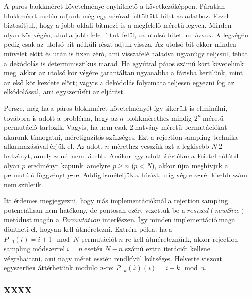 \documentclass[
    parspace,
    noindent,
    nohyp,
]{elteiktdk}[2023/04/10]
\begin{document}
A páros blokkméret követelménye enyhíthető a következőképpen.
Páratlan blokkméret esetén adjunk még egy zéróval feltöltött bitet az adathoz.
Ezzel biztosítjuk, hogy a jobb oldali bitmező is a megfelelő méretű legyen.
Minden olyan kör végén, ahol a jobb felet írtuk felül, az utolsó bitet nullázzuk.
A legvégén pedig csak az utolsó bit nélküli részt adjuk vissza.
Az utolsó bit ekkor minden művelet előtt és után is fixen zéró,
ami visszafelé haladva ugyanúgy teljesul, tehát a dekódolás is determinisztikus marad.
Ha egyúttal páros számú kört követelünk meg,
akkor az utolsó kör végére garantáltan ugyanabba a fázisba kerülünk, mint az első kör kezdete előtt;
vagyis a dekódolás folyamata teljesen egyezni fog az elkódolással, ami egyszerűsíti az eljárást.




Persze, még ha a páros blokkméret követelményét így sikerült is eliminálni,
továbbra is adott a probléma, hogy az $n$ blokkmérethez mindig $2^n$ méretű permutáció tartozik.
Vagyis, ha nem csak 2-hatvány méretű permutációkat akarunk támogatni, méretigazítás szükséges.
Ezt a rejection sampling technika alkalmazásával érjük el.
Az adott $n$ mérethez vesszük azt a legkisebb $N$ 2-hatványt, amely $n$-nél nem kisebb.
Amikor egy adott $i$ értékre a Feistel-hálótól olyan $p$ eredményt kapunk, amelyre $p \geq n$ ($p < N$),
akkor újra meghívjuk a permutáló függvényt $p$-re.
Addig ismételjük a hívást, míg végre $n$-nél kisebb szám nem születik.

Itt érdemes megjegyezni, hogy más implementációknál a rejection sampling potenciálisan nem hatékony,
de pontosan ezért vezettük be a $resized(newSize)$ metódust magán a $Permutation$ interfészen.
Így minden implementáció maga döntheti el, hogyan kell átméretezni.
Extrém példa: ha a $P_{+1}(i) = i + 1 \mod N$ permutációt $n$-re kell átméreteznünk,
akkor rejection sampling módszerrel $i = n$ esetén $N - n$ számú extra iterációt kellene végrehajtani,
ami nagy méret esetén rendkívül költséges.
Helyette viszont egyszerűen áttérhetünk modulo $n$-re: $P_{+k}(k)(i) = i + k \mod n$.

\subsubsection{XXXX}
\end{document}
